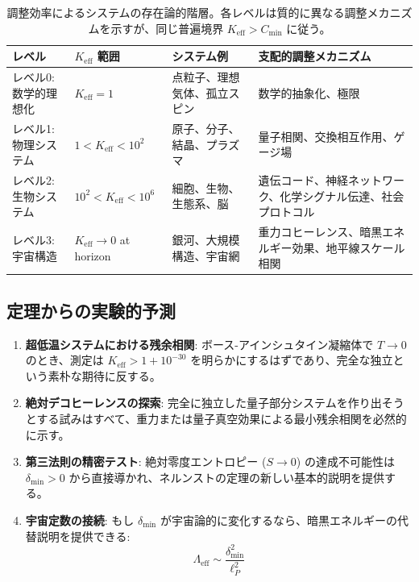 \documentclass[11pt,a4paper]{article}
\begin{document}
	\begin{table}[htbp]
		\centering
		\small
	
			\begin{tabular}{|p{}|p{}|p{}|p{}|}
				\hline
				\textbf{レベル} & \textbf{$K_{\mathrm{eff}}$ 範囲} & \textbf{システム例} & \textbf{支配的調整メカニズム} \\
				\hline
				レベル0: 数学的理想化 & $K_{\mathrm{eff}} = 1$ & 点粒子、理想気体、孤立スピン & 数学的抽象化、極限 \\
				\hline
				レベル1: 物理システム & $1 < K_{\mathrm{eff}} < 10^2$ & 原子、分子、結晶、プラズマ & 量子相関、交換相互作用、ゲージ場 \\
				\hline
				レベル2: 生物システム & $10^2 < K_{\mathrm{eff}} < 10^6$ & 細胞、生物、生態系、脳 & 遺伝コード、神経ネットワーク、化学シグナル伝達、社会プロトコル \\
				\hline
				レベル3: 宇宙構造 & $K_{\mathrm{eff}} \to 0$ at horizon & 銀河、大規模構造、宇宙網 & 重力コヒーレンス、暗黒エネルギー効果、地平線スケール相関 \\
				\hline
			\end{tabular}
	
		\caption{調整効率によるシステムの存在論的階層。各レベルは質的に異なる調整メカニズムを示すが、同じ普遍境界 $K_{\mathrm{eff}} > C_{\min}$ に従う。}
		\label{tab:ontology-hierarchy}
	\end{table}
	
	\subsection{定理からの実験的予測}
	
	\begin{enumerate}
		\item \textbf{超低温システムにおける残余相関}: ボース-アインシュタイン凝縮体で $T \to 0$ のとき、測定は $K_{\mathrm{eff}} > 1 + 10^{-30}$ を明らかにするはずであり、完全な独立という素朴な期待に反する。
		\item \textbf{絶対デコヒーレンスの探索}: 完全に独立した量子部分システムを作り出そうとする試みはすべて、重力または量子真空効果による最小残余相関を必然的に示す。
		\item \textbf{第三法則の精密テスト}: 絶対零度エントロピー ($S \to 0$) の達成不可能性は $\delta_{\min} > 0$ から直接導かれ、ネルンストの定理の新しい基本的説明を提供する。
		\item \textbf{宇宙定数の接続}: もし $\delta_{\min}$ が宇宙論的に変化するなら、暗黒エネルギーの代替説明を提供できる:
		\begin{equation}
			\Lambda_{\mathrm{eff}} \sim \frac{\delta_{\min}^2}{\ell_P^2}
		\end{equation}
	\end{enumerate}
	
\end{document}
